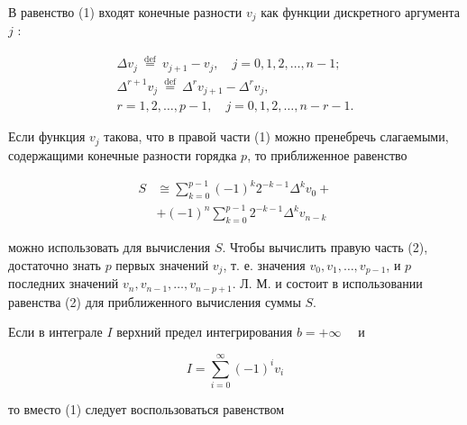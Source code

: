 \documentclass[10pt]{article}
\begin{document}
В равенство (1) входят конечные разности $v_{j}$ как функции дискретного аргумента $j$ :



\[

\begin{gathered}

\Delta v_{j} \stackrel{\text { def }}{=} v_{j+1}-v_{j}, \quad j=0,1,2, \ldots, n-1 ; \\

\Delta^{r+1} v_{j} \stackrel{\text { def }}{=} \Delta^{r} v_{j+1}-\Delta^{r} v_{j}, \\

r=1,2, \ldots, p-1, \quad j=0,1,2, \ldots, n-r-1 .

\end{gathered}

\]



Если функция $v_{j}$ такова, что в правой части (1) можно пренебречь слагаемыми, содержащими конечные разности горядка $p$, то приближенное равенство



\[

\begin{aligned}

S & \cong \sum_{k=0}^{p-1}(-1)^{k} 2^{-k-1} \Delta^{k} v_{0}+ \\

& +(-1)^{n} \sum_{k=0}^{p-1} 2^{-k-1} \Delta^{k} v_{n-k}

\end{aligned}

\]



можно использовать для вычисления $S$. Чтобы вычислить правую часть (2), достаточно знать $p$ первых значений $v_{j}$, т. е. значения $v_{0}, v_{1}, \ldots, v_{p-1}$, и $p$ последних значений $v_{n}, v_{n-1}, \ldots, v_{n-p+1}$. Л. М. и состоит в использовании равенства (2) для приближенного вычисления суммы $S$.



Если в интеграле $I$ верхний предел интегрирования $b=+\infty \quad$ и



\[

I=\sum_{i=0}^{\infty}(-1)^{i} v_{i}

\]



то вместо (1) следует воспользоваться равенством
\end{document}
